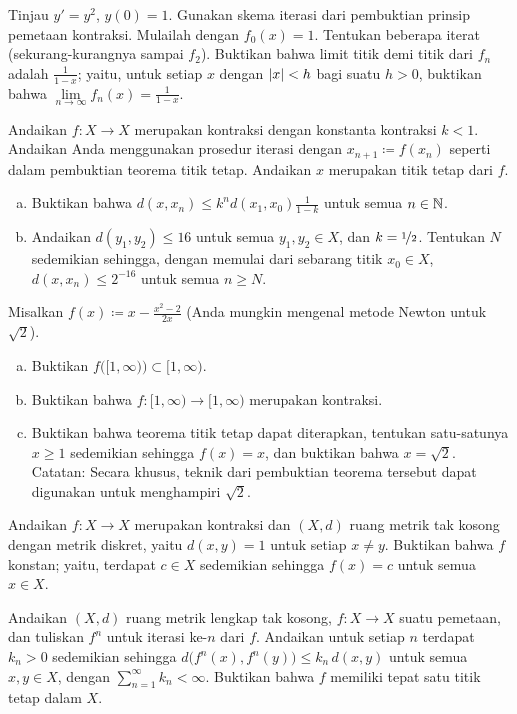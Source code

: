\begin{exercise}
Tinjau $y' =y^2$, $y(0)=1$.  Gunakan skema iterasi
dari pembuktian prinsip pemetaan kontraksi.
Mulailah dengan $f_0(x) = 1$.  Tentukan beberapa 
iterat (sekurang-kurangnya sampai $f_2$).  Buktikan bahwa
limit titik demi titik dari $f_n$ adalah $\frac{1}{1-x}$; yaitu, untuk setiap $x$
dengan $\lvert {x} \rvert < h$ bagi suatu $h > 0$,
buktikan bahwa $\lim\limits_{n\to\infty}f_n(x) = \frac{1}{1-x}$.
\end{exercise}

\begin{exercise}
Andaikan $f \colon X \to X$ merupakan kontraksi dengan konstanta kontraksi $k < 1$.  Andaikan Anda menggunakan prosedur
iterasi dengan $x_{n+1} \coloneqq f(x_n)$ seperti dalam pembuktian teorema titik tetap.
Andaikan $x$ merupakan titik
tetap dari $f$.
\begin{enumerate}[a)]
\item
Buktikan bahwa $d(x,x_n) \leq k^n d(x_1,x_0) \frac{1}{1-k}$ untuk semua $n \in {\mathbb{N}}$.
\item
Andaikan $d(y_1,y_2) \leq 16$ untuk semua $y_1,y_2 \in X$, dan $k=
\nicefrac{1}{2}$.  Tentukan $N$ sedemikian sehingga, dengan memulai dari sebarang titik $x_0 \in X$, 
$d(x,x_n) \leq 2^{-16}$ untuk semua $n \geq N$.
\end{enumerate}
\end{exercise}

\begin{exercise}
Misalkan $f(x) \coloneqq x-\frac{x^2-2}{2x}$ (Anda mungkin mengenal metode Newton untuk
$\sqrt{2}$).
\begin{enumerate}[a)]
\item
Buktikan $f\bigl([1,\infty)\bigr) \subset [1,\infty)$.
\item
Buktikan bahwa $f \colon [1,\infty) \to [1,\infty)$ merupakan kontraksi.
\item
Buktikan bahwa teorema titik tetap dapat diterapkan,
tentukan satu-satunya $x \geq 1$ sedemikian sehingga $f(x) = x$,
dan buktikan bahwa $x = \sqrt{2}$.
Catatan: Secara khusus, teknik dari pembuktian teorema tersebut
dapat digunakan untuk menghampiri $\sqrt{2}$.
\end{enumerate}
\end{exercise}

\begin{exercise}
Andaikan $f \colon X \to X$ merupakan kontraksi dan $(X,d)$ ruang metrik tak kosong
dengan metrik diskret, yaitu $d(x,y) = 1$ untuk setiap $x \neq y$.
Buktikan bahwa $f$ konstan; yaitu,
terdapat $c \in X$ sedemikian sehingga $f(x) = c$ untuk semua $x \in X$.
\end{exercise}

\begin{exercise}
Andaikan $(X,d)$ ruang metrik lengkap tak kosong,
$f \colon X \to X$ suatu pemetaan, dan tuliskan
$f^n$ untuk iterasi ke-$n$ dari $f$.  Andaikan
untuk setiap $n$ terdapat $k_n > 0$ sedemikian sehingga
$d\bigl(f^n(x),f^n(y)\bigr) \leq k_n \, d(x,y)$
untuk semua $x,y \in X$,
dengan $\sum_{n=1}^\infty k_n < \infty$.
Buktikan bahwa $f$ memiliki tepat satu titik tetap dalam $X$.
\end{exercise}

